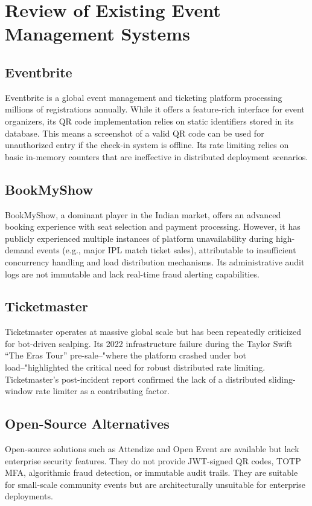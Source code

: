 \documentclass[12pt,a4paper]{report}
\begin{document}
\section{Review of Existing Event Management Systems}

\subsection{Eventbrite}
Eventbrite is a global event management and ticketing platform processing millions of registrations annually. While it offers a feature-rich interface for event organizers, its QR code implementation relies on static identifiers stored in its database. This means a screenshot of a valid QR code can be used for unauthorized entry if the check-in system is offline. Its rate limiting relies on basic in-memory counters that are ineffective in distributed deployment scenarios.

\subsection{BookMyShow}
BookMyShow, a dominant player in the Indian market, offers an advanced booking experience with seat selection and payment processing. However, it has publicly experienced multiple instances of platform unavailability during high-demand events (e.g., major IPL match ticket sales), attributable to insufficient concurrency handling and load distribution mechanisms. Its administrative audit logs are not immutable and lack real-time fraud alerting capabilities.

\subsection{Ticketmaster}
Ticketmaster operates at massive global scale but has been repeatedly criticized for bot-driven scalping. Its 2022 infrastructure failure during the Taylor Swift ``The Eras Tour'' pre-sale--"where the platform crashed under bot load--"highlighted the critical need for robust distributed rate limiting. Ticketmaster's post-incident report confirmed the lack of a distributed sliding-window rate limiter as a contributing factor.

\subsection{Open-Source Alternatives}
Open-source solutions such as Attendize and Open Event are available but lack enterprise security features. They do not provide JWT-signed QR codes, TOTP MFA, algorithmic fraud detection, or immutable audit trails. They are suitable for small-scale community events but are architecturally unsuitable for enterprise deployments.
\end{document}
